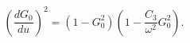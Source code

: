 \begin{equation}
\left(\frac{dG_0}{du}\right)^2 = ( 1 - G_0^2 )\left( 1 - 
\frac{C_3}{\omega^2} G_0^2 \right).
\end{equation}

